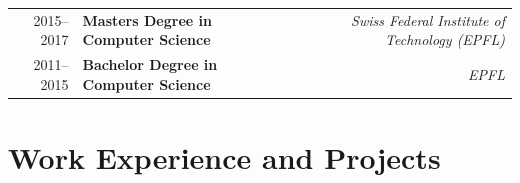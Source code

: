 \documentclass[a4paper,11pt]{article} %
\begin{document}
\begin{tabularx}{\textwidth}{r X r} 	
2015--2017 & 
\textbf{Masters Degree in Computer Science} & 
\textit{Swiss Federal Institute of Technology (EPFL)}\\


2011--2015 & 
\textbf{Bachelor Degree in Computer Science} & 
\textit{ EPFL }\\


\end{tabularx}


\section{Work Experience and Projects}
\end{document}
